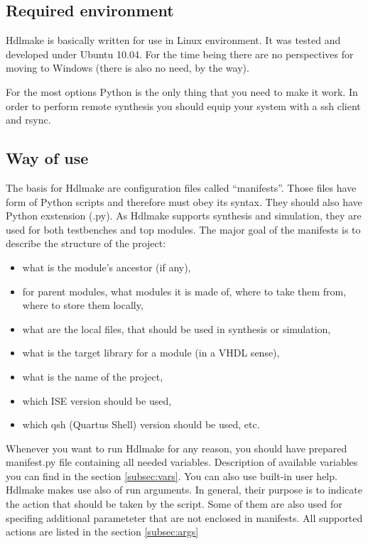 \documentclass[a4paper,11pt]{article}
\begin{document}
\subsection*{Required environment}
Hdlmake is basically written for use in Linux environment. It was tested and developed under Ubuntu 10.04. For the time being there are no perspectives for moving to Windows (there is also no need, by the way).

For the most options Python is the only thing that you need to make it work.
In order to perform remote synthesis you should equip your system with a ssh client and rsync.
\subsection*{Way of use}
The basis for Hdlmake are configuration files called ``manifests''. Those files have form of Python scripts and therefore must obey its syntax. They should also have Python exstension (.py). As Hdlmake supports synthesis and simulation, they are used for both testbenches and top modules. The major goal of the manifests is to describe the structure of the project:
\begin{itemize}
    \item what is the module's ancestor (if any),
    \item for parent modules, what modules it is made of, where to take them from, where to store them locally,
    \item what are the local files, that should be used in synthesis or simulation,
    \item what is the target library for a module (in a VHDL sense),
    \item what is the name of the project,
    \item which ISE version should be used,
    \item which qsh (Quartus Shell) version should be used, etc.
\end{itemize}

Whenever you want to run Hdlmake for any reason, you should have prepared manifest.py file containing all needed variables. Description of available variables you can find in the section \ref{subsec:vars}. You can also use built-in user help.
Hdlmake makes use also of run arguments. In general, their purpose is to indicate the action that should be taken by the script. Some of them are also used for specifing additional parameteter that are not enclosed in manifests. All supported actions are listed in the section \ref{subsec:args}
\end{document}
